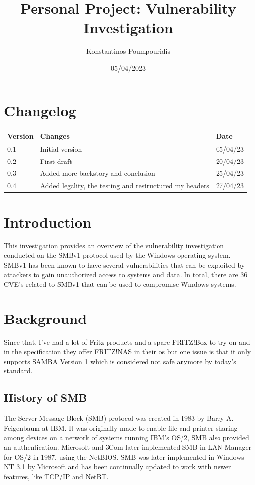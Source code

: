 \documentclass[12pt, letterpaper]{article}
\title{Personal Project: Vulnerability Investigation}
\author{Konstantinos Poumpouridis}
\date{05/04/2023}
\newcommand{\titlepicture}[2][]{%
  \renewcommand\placetitlepicture{%
    \texttt{[image: \#2]}\par\medskip
  }%
}
\newcommand{\placetitlepicture}{} %
\begin{document}
\titlepicture[width=1.5\textwidth]{fotos/PVI/Fritzbox/Fritzfrontpage.jpeg}
\maketitle
\thispagestyle{empty}

\newpage
\section{Changelog}
    \begin{table}[htbp]
        \begin{tabular}{|l|l|l|}
            \hline
            Version & Changes         & Date   \tabularnewline \hline
            0.1     & Initial version & 05/04/23 \tabularnewline \hline
            0.2     &  First draft & 20/04/23 \tabularnewline \hline
            0.3     &  Added more backstory and conclusion & 25/04/23 \tabularnewline \hline
            0.4     &  Added legality, the testing and restructured my headers & 27/04/23 \tabularnewline \hline
        \end{tabular}
    \end{table}
\newpage
\tableofcontents
\newpage

\section{Introduction}
This investigation provides an overview of the vulnerability investigation conducted on the SMBv1 protocol used by the Windows operating system. SMBv1 has been known to have several vulnerabilities that can be exploited by attackers to gain unauthorized access to systems and data. In total, there are 36 CVE's related to SMBv1 that can be used to compromise Windows systems.

\section{Background}
Since that, I've had a lot of Fritz products and a spare FRITZ!Box to try on and in the specification they offer FRITZ!NAS in their os but one issue is that it only supports SAMBA Version 1 which is considered not safe anymore by today's standard.

\subsection{History of SMB}
The Server Message Block (SMB) protocol was created in 1983 by Barry A. Feigenbaum at IBM. It was originally made to enable file and printer sharing among devices on a network of systems running IBM's OS/2, SMB also provided an authentication. Microsoft and 3Com later implemented SMB in LAN Manager for OS/2 in 1987, using the NetBIOS. SMB was later implemented in Windows NT 3.1 by Microsoft and has been continually updated to work with newer features, like TCP/IP and NetBT. 
\end{document}
